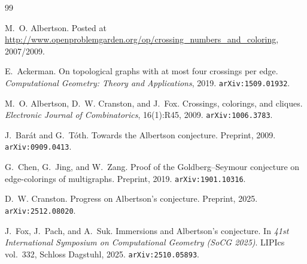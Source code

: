 \documentclass[11pt,a4paper]{article}
\theoremstyle{definition}
\begin{document}

\begin{thebibliography}{99}

M.~O. Albertson.
Posted at
\url{http://www.openproblemgarden.org/op/crossing_numbers_and_coloring},
2007/2009.

E.~Ackerman.
On topological graphs with at most four crossings per edge.
\textit{Computational Geometry: Theory and Applications}, 2019.
\texttt{arXiv:1509.01932}.

M.~O. Albertson, D.~W. Cranston, and J.~Fox.
Crossings, colorings, and cliques.
\textit{Electronic Journal of Combinatorics}, 16(1):R45, 2009.
\texttt{arXiv:1006.3783}.

J.~Bar\'at and G.~T\'oth.
Towards the Albertson conjecture.
Preprint, 2009.
\texttt{arXiv:0909.0413}.

G.~Chen, G.~Jing, and W.~Zang.
Proof of the Goldberg--Seymour conjecture on edge-colorings of multigraphs.
Preprint, 2019.
\texttt{arXiv:1901.10316}.

D.~W. Cranston.
Progress on Albertson's conjecture.
Preprint, 2025.
\texttt{arXiv:2512.08020}.

J.~Fox, J.~Pach, and A.~Suk.
Immersions and Albertson's conjecture.
In \textit{41st International Symposium on Computational Geometry (SoCG 2025)}.
LIPIcs vol.~332, Schloss Dagstuhl, 2025.
\texttt{arXiv:2510.05893}.

\end{thebibliography}
\end{document}
